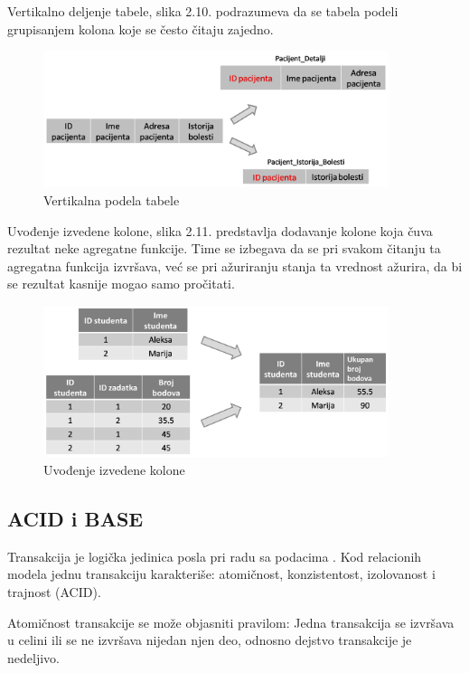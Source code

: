 \documentclass[12pt,oneside]{memoir}
\begin{document}
Vertikalno deljenje tabele, slika 2.10. podrazumeva da se tabela podeli grupisanjem kolona koje se često čitaju zajedno. 

\begin{figure}[!ht]
  \centering
  \includegraphics[width=0.9\textwidth]{denormalizacija3.png}
  \caption{Vertikalna podela tabele}
  \label{fig:grafikon}
\end{figure}

Uvođenje izvedene kolone, slika 2.11. predstavlja dodavanje kolone koja čuva rezultat neke agregatne funkcije. Time se izbegava da se pri svakom čitanju ta agregatna funkcija izvršava, već se pri ažuriranju stanja ta vrednost ažurira, da bi se rezultat kasnije mogao samo pročitati.


\begin{figure}[!ht]
  \centering
  \includegraphics[width=0.9\textwidth]{denormalizacija4.png}
  \caption{Uvođenje izvedene kolone}
  \label{fig:grafikon}
\end{figure}
\pagebreak

\subsection{ACID i BASE}

Transakcija je logička jedinica posla pri radu sa podacima \cite{URBP}. Kod relacionih modela jednu transakciju karakteriše: atomičnost, konzistentost, izolovanost i trajnost (ACID).

Atomičnost transakcije se može objasniti pravilom: Jedna transakcija se izvršava u celini ili se ne izvršava nijedan njen deo, odnosno dejstvo transakcije je nedeljivo. 
\end{document}

